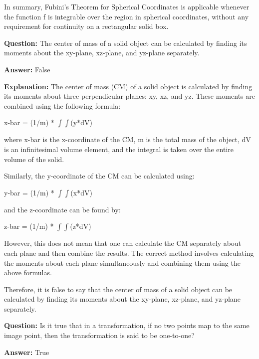 \documentclass{article}
\begin{document}
In summary, Fubini's Theorem for Spherical Coordinates is applicable whenever the function f is integrable over the region in spherical coordinates, without any requirement for continuity on a rectangular solid box.
                
                \vspace{0.5cm} 
        
            
                \textbf {Question:} The center of mass of a solid object can be calculated by finding its moments about the xy-plane, xz-plane, and yz-plane separately.
                
                \textbf{Answer:} False

                \textbf{Explanation:} The center of mass (CM) of a solid object is calculated by finding its moments about three perpendicular planes: xy, xz, and yz. These moments are combined using the following formula:

x-bar = (1/m) * \ensuremath{\int}\ensuremath{\int}(y*dV)

where x-bar is the x-coordinate of the CM, m is the total mass of the object, dV is an infinitesimal volume element, and the integral is taken over the entire volume of the solid.

Similarly, the y-coordinate of the CM can be calculated using:

y-bar = (1/m) * \ensuremath{\int}\ensuremath{\int}(x*dV)

and the z-coordinate can be found by:

z-bar = (1/m) * \ensuremath{\int}\ensuremath{\int}(z*dV)

However, this does not mean that one can calculate the CM separately about each plane and then combine the results. The correct method involves calculating the moments about each plane simultaneously and combining them using the above formulas.

Therefore, it is false to say that the center of mass of a solid object can be calculated by finding its moments about the xy-plane, xz-plane, and yz-plane separately.
                
                \vspace{0.5cm} 
        
            
                \textbf {Question:} Is it true that in a transformation, if no two points map to the same image point, then the transformation is said to be one-to-one?
                
                \textbf{Answer:} True
\end{document}
